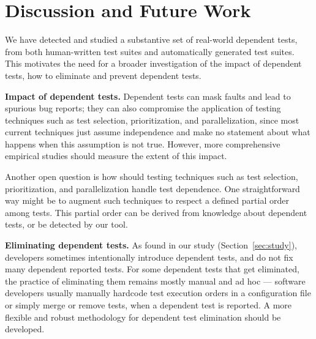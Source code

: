 \section{Discussion and Future Work}
\label{sec:discussion}



We have detected and studied a substantive set of
real-world dependent tests, from both human-written test suites and
automatically generated test suites. This motivates
the need for a broader
investigation of the impact of dependent tests,
how to eliminate and prevent dependent tests.

\vspace{1mm}

\noindent \textbf{{Impact of dependent tests.}}
Dependent tests can mask faults and lead to
spurious bug reports; they can also 
compromise the application of
testing techniques such as test selection,
prioritization, and parallelization, since
most current techniques just assume independence and
make no statement about what happens when this
assumption is not true. However,
more comprehensive empirical studies should measure  
the extent of this impact.


Another open question is how should
testing techniques such as test
selection, prioritization, and parallelization
handle test dependence.
One straightforward way 
might be to augment such techniques to respect a
defined partial order among tests. This partial order
can be derived from knowledge about dependent tests,
or be detected by our \ourtool tool.



\vspace{1mm}

\noindent \textbf{{Eliminating dependent tests.}}
As found in our study (Section~\ref{sec:study}),
developers sometimes intentionally introduce dependent tests,
and do not fix many dependent reported tests.
For some dependent tests that get eliminated,
the practice of eliminating them
remains mostly manual and ad hoc --- software developers
usually manually hardcode test
execution orders in a configuration file or
simply merge or remove tests, when a dependent test is reported. 
A more flexible and robust methodology for
dependent test elimination should be developed.

